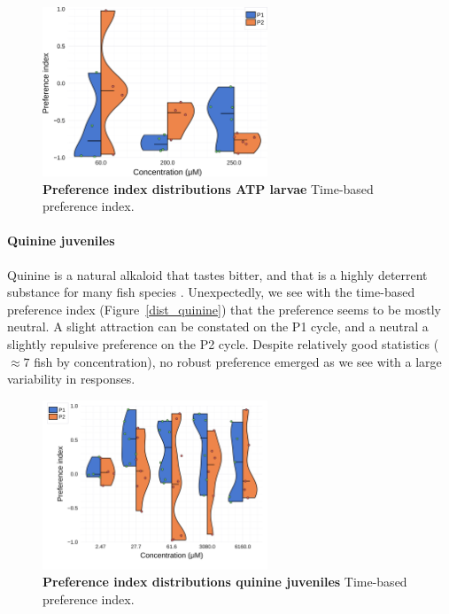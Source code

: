     \begin{figure}[h]
      \centering
      \includegraphics[width=0.6\textwidth]{part_2/assets/dist_atp_lar.png}
      \caption{\textbf{Preference index distributions ATP larvae} Time-based preference index. }
      \label{dist_atp}
    \end{figure}

  \paragraph{Quinine juveniles} Quinine is a natural alkaloid that tastes bitter, and that is a highly deterrent substance for many fish species \cite{kasumyan2003taste}. Unexpectedly, we see with the time-based preference index (Figure~\ref{dist_quinine}) that the preference seems to be mostly neutral. A slight attraction can be constated on the P1 cycle, and a neutral a slightly repulsive preference on the P2 cycle. Despite relatively good statistics ($\approx 7$ fish by concentration), no robust preference emerged as we see with a large variability in responses.

    \begin{figure}[h]
      \centering
      \includegraphics[width=0.6\textwidth]{part_2/assets/dist_quinine.png}
      \caption{\textbf{Preference index distributions quinine juveniles} Time-based preference index. }
      \label{dist_atp}
    \end{figure}


